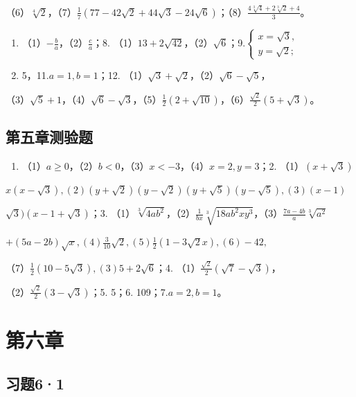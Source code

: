 （6）\(\sqrt[4]{2}\)，（7）\(\frac{1}{7}(77 - 42\sqrt{2} + 44\sqrt{3} - 24\sqrt{6})\)；（8）\(\frac{4\sqrt[3]{4} + 2\sqrt[3]{2} + 4}{3}\)。

\begin{enumerate}[start=6]
\item
  （1）\(-\frac{b}{a}\)，（2）\(\frac{c}{a}\)；8.
  （1）\(13 + 2\sqrt{42}\)，（2）\(\sqrt{6}\)；9.\(\left\{ \begin{array}{l} x = \sqrt{3}, \\ y = \sqrt{2}; \end{array} \right.\)
\item
  5，11.\(a = 1, b = 1\)；12.
  （1）\(\sqrt{3} + \sqrt{2}\)，（2）\(\sqrt{6} - \sqrt{5}\)，
\end{enumerate}

（3）\(\sqrt{5} + 1\)，（4）\(\sqrt{6} - \sqrt{3}\)，（5）\(\frac{1}{2}(2 + \sqrt{10})\)，（6）\(\frac{\sqrt{2}}{2}(5 + \sqrt{3})\)。

\subsection{第五章测验题}

\begin{enumerate}
\item
  （1）\(a \geqslant 0\)，（2）\(b < 0\)，（3）\(x < -3\)，（4）\(x = 2, y = 3\)；2.
  （1）\((x + \sqrt{3})\)
\end{enumerate}

\(x(x - \sqrt{3}), (2)(y + \sqrt{2})(y - \sqrt{2})(y + \sqrt{5})(y - \sqrt{5}), (3)(x - 1)\)

\(\sqrt{3})(x - 1 + \sqrt{3})\)；3.
（1）\(\sqrt[3]{4ab^2}\)，（2）\(\frac{1}{bx}\sqrt[3]{18ab^2xy^3}\)，（3）\(\frac{7a - 4b}{a}\sqrt[3]{a^2}\)

\(+ (5a - 2b)\sqrt{x}, (4)\frac{3}{10}\sqrt{2}, (5)\frac{1}{2}(1 - 3\sqrt{2}x), (6) - 42,\)

（7）\(\frac{1}{2} (10 - 5\sqrt{3}), (3) 5 + 2\sqrt{6}\)；4.
（1）\(\frac{\sqrt{2}}{2} (\sqrt{7} - \sqrt{3})\)，

（2）\(\frac{\sqrt{2}}{2} (3 - \sqrt{3})\)；5. 5；6.
109；7.\(a = 2, b = 1\)。

\section{第六章}

\subsection{习题6·1}

